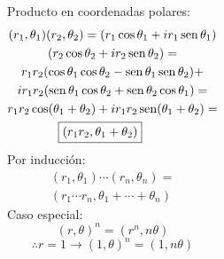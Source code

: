 \documentclass[9pt, aspectratio=169]{beamer}
\begin{document}
\begin{frame}
\begin{columns}[t]
		Producto en coordenadas polares:
		\begin{multline*}
			(r_1, \theta_1)(r_2, \theta_2) = (r_1 \cos \theta_1 + i r_1 \operatorname{sen} \theta_1) \\
			(r_2 \cos \theta_2 + i r_2 \operatorname{sen} \theta_2)= \\
			r_1 r_2 (\cos \theta_1 \cos \theta_2 - \operatorname{sen} \theta_1 \operatorname{sen} \theta_2) + \\
			i r_1 r_2 (\operatorname{sen} \theta_1 \cos \theta_2 + \operatorname{sen} \theta_2 \cos \theta_1) = \\
			r_1 r_2 \cos(\theta_1 + \theta_2) + i r_1 r_2 \operatorname{sen}(\theta_1 + \theta_2) = \\
			\boxed{ (r_1 r_2, \theta_1 + \theta_2) } \qquad
		\end{multline*}
		Por inducción:
		\begin{multline*}
			(r_1, \theta_1) \cdots (r_n, \theta_n) = \\
			(r_1 \cdots r_n, \theta_1 + \cdots + \theta_n)
		\end{multline*}
		Caso especial:
		\[ (r, \theta)^n = (r^n, n \theta) \]
		\[ \therefore r = 1 \rightarrow (1, \theta)^n = (1, n \theta) \]
	\end{columns}
\end{frame}
\end{document}
